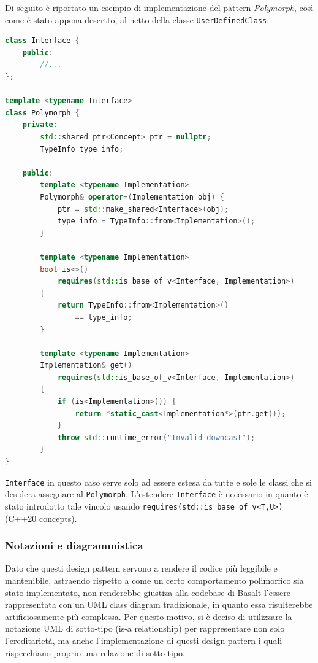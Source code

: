 \newpage

Di seguito è riportato un esempio di implementazione del pattern \textit{Polymorph}, così come è stato appena descrtto,
al netto della classe \texttt{UserDefinedClass}: \\

\vspace{0.5cm}
\begin{lstlisting}[language=C++, frame=single]
class Interface {
    public:
        //...
};

template <typename Interface>
class Polymorph {
    private:
        std::shared_ptr<Concept> ptr = nullptr;
        TypeInfo type_info;

    public:
        template <typename Implementation>
        Polymorph& operator=(Implementation obj) {
            ptr = std::make_shared<Interface>(obj);
            type_info = TypeInfo::from<Implementation>();
        }

        template <typename Implementation>
        bool is<>() 
            requires(std::is_base_of_v<Interface, Implementation>)
        { 
            return TypeInfo::from<Implementation>() 
                == type_info; 
        }

        template <typename Implementation>
        Implementation& get() 
            requires(std::is_base_of_v<Interface, Implementation>)
        {
            if (is<Implementation>()) {
                return *static_cast<Implementation*>(ptr.get());
            }
            throw std::runtime_error("Invalid downcast");
        }
}
\end{lstlisting}
\vspace{0.5cm}

\texttt{Interface} in questo caso serve solo ad essere estesa da tutte e sole le classi che si desidera 
assegnare al \texttt{Polymorph}. L'estendere \texttt{Interface} è necessario in quanto è stato 
introdotto tale vincolo usando \texttt{requires(std::is\_base\_of\_v<T,U>)} (C++20 concepts).

\newpage

\subsubsection{Notazioni e diagrammistica}
Dato che questi design pattern servono a rendere il codice più leggibile e mantenibile, astraendo rispetto 
a come un certo comportamento polimorfico sia stato implementato, non renderebbe giustiza alla codebase di Basalt 
l'essere rappresentata con un UML class diagram tradizionale, in quanto essa risulterebbe artificiosamente più complessa. Per 
questo motivo, si è deciso di utilizzare la notazione UML di sotto-tipo (is-a relationship) per rappresentare
non solo l'ereditarietà, ma anche l'implementazione di questi design pattern i quali rispecchiano proprio una 
relazione di sotto-tipo. \\

